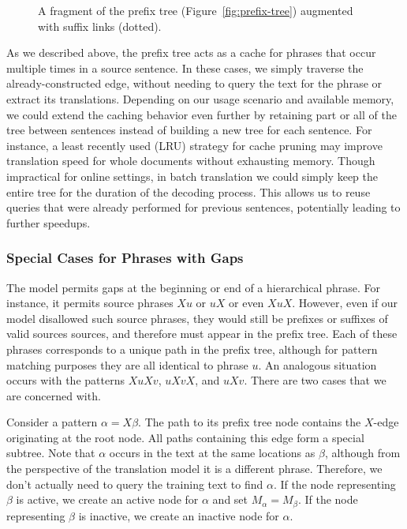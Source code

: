 \figpreamble
\begin{figure}
	\figfontsize{
	\begin{center}
		
	\end{center}}
	\figpostamble
	\caption[A fragment of the prefix tree augmented with suffix links.]{A fragment of the prefix tree (Figure~\ref{fig:prefix-tree}) augmented with suffix links (dotted).}
	\label{fig:prefix-tree-suffix-links}
\end{figure}

As we described above, the prefix tree acts as a cache 
for phrases that occur multiple
times in a source sentence.  In these cases, we simply
traverse the already-constructed edge, without needing to
query the text for the phrase or extract its translations.  Depending on our usage
scenario and available memory, we could extend the caching 
behavior even further by retaining part or all of the tree 
between sentences instead of building a new tree for 
each sentence.  For instance, a least recently used (LRU)
strategy for cache pruning may improve translation speed for whole
documents without exhausting memory.  Though impractical for online settings,
in batch translation we could simply keep the
entire tree for the duration of the decoding process.  This
allows us to reuse queries that were already performed for
previous sentences, potentially leading to further speedups.

\subsubsection{Special Cases for Phrases with Gaps}\label{sec:special-cases}

The model permits gaps at the beginning or end of a hierarchical phrase.
For instance, it permits source phrases $Xu$ or $uX$ or even $XuX$.
However, even if our model disallowed such source phrases, they would still
be prefixes or suffixes of valid sources sources, and therefore must
appear in the prefix tree.  Each of these phrases corresponds to a 
unique path in the prefix tree, although 
for pattern matching purposes they are all identical to phrase $u$.
An analogous situation occurs with the patterns $XuXv$, $uXvX$, 
and $uXv$.  There are two cases that we are concerned with.

Consider a pattern $\alpha = X\beta$.  The path to its prefix 
tree node contains the $X$-edge originating at the root
node.  All paths containing this edge form a special subtree.
Note that $\alpha$ occurs in the text at the same locations as
$\beta$, although from the perspective of the translation model
it is a different phrase.  Therefore, we don't actually
need to query the training text to find $\alpha$.  If the node 
representing $\beta$ is active, we create an active node 
for $\alpha$ and set $M_\alpha = M_\beta$.  If the node 
representing $\beta$ is inactive, we create an inactive node for $\alpha$.

